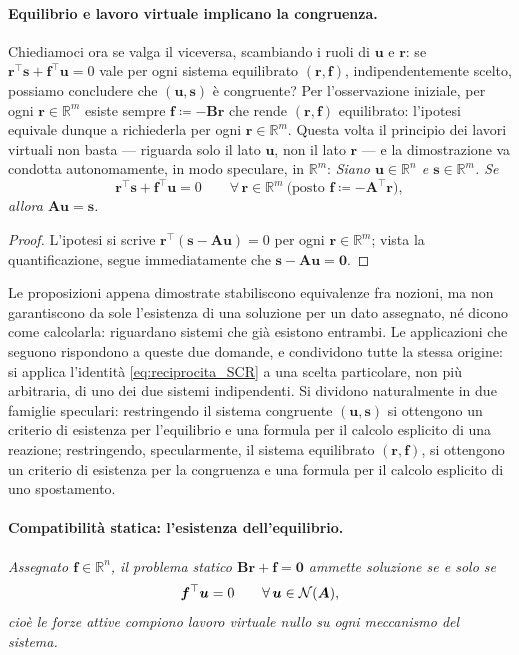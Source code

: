 \paragraph{Equilibrio e lavoro virtuale implicano la congruenza.}
Chiediamoci ora se valga il viceversa, scambiando i ruoli di
$\bm u$ e $\bm r$: se $\bm r^\top\bm s+\bm f^\top\bm u=0$ vale
per ogni sistema equilibrato $(\bm r,\bm f)$, indipendentemente
scelto, possiamo concludere che $(\bm u,\bm s)$ è congruente?
Per l'osservazione iniziale, per ogni $\bm r\in\mathbb R^m$
esiste sempre $\bm f\coloneqq-\bm B\bm r$ che rende
$(\bm r,\bm f)$ equilibrato: l'ipotesi equivale dunque a
richiederla per ogni $\bm r\in\mathbb R^m$. Questa volta il
principio dei lavori virtuali non basta --- riguarda solo il
lato $\bm u$, non il lato $\bm r$ --- e la dimostrazione va
condotta autonomamente, in modo speculare, in $\mathbb R^m$:
\bigskip
\emph{
	Siano $\bm u\in\mathbb R^n$ e $\bm s\in\mathbb R^m$. Se
	\begin{equation}
		\bm r^\top\bm s+\bm f^\top\bm u=0
		\qquad\forall\,\bm r\in\mathbb R^m\ \big(\text{posto }\bm f\coloneqq-\bm A^\top\bm r\big),
	\end{equation}
	allora $\bm A\bm u=\bm s$.
}
\begin{proof}
	L'ipotesi si scrive $\bm r^\top(\bm s-\bm A\bm u)=0$ per
	ogni $\bm r\in\mathbb R^m$; vista la quantificazione, segue immediatamente che $\bm s-\bm A\bm u=\bm 0$.
\end{proof}

\bigskip

Le proposizioni appena dimostrate stabiliscono equivalenze fra
nozioni, ma non garantiscono da sole l'esistenza di una
soluzione per un dato assegnato, né dicono come calcolarla:
riguardano sistemi che già esistono entrambi. Le applicazioni
che seguono rispondono a queste due domande, e condividono
tutte la stessa origine: si applica l'identità
\eqref{eq:reciprocita_SCR} a una scelta particolare, non più
arbitraria, di uno dei due sistemi indipendenti. Si dividono
naturalmente in due famiglie speculari: restringendo il sistema
congruente $(\bm u,\bm s)$ si ottengono un criterio di esistenza
per l'equilibrio e una formula per il calcolo esplicito di una
reazione; restringendo, specularmente, il sistema equilibrato
$(\bm r,\bm f)$, si ottengono un criterio di esistenza per la
congruenza e una formula per il calcolo esplicito di uno
spostamento.

\paragraph{Compatibilità statica: l'esistenza dell'equilibrio.}
	\label{cor:compat_stat}
\emph{	Assegnato $\bm f\in\mathbb R^n$, il problema statico
	$\bm B\bm r+\bm f=\bm 0$ ammette soluzione se e solo se
	\begin{equation}\label{eq:compat_stat}
		\bm f^\top\bm u = 0\qquad\forall\,\bm u\in\mathcal{N}(\bm A),
	\end{equation}
	cioè le forze attive compiono lavoro virtuale nullo su
	ogni meccanismo del sistema.}
	
